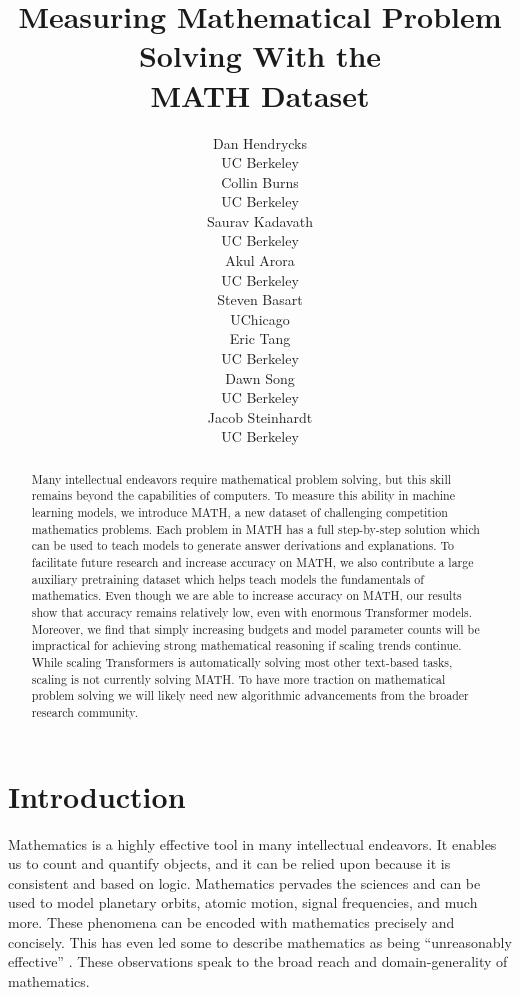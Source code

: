 \documentclass{article}
\title{Measuring Mathematical Problem Solving With the\\ MATH Dataset}
\date{}
\author{Dan Hendrycks\\
UC Berkeley\\
\And
Collin Burns\\
UC Berkeley\\
\And
Saurav Kadavath\\
UC Berkeley\\
\And
Akul Arora\\
UC Berkeley\\
\And
Steven Basart\\
UChicago\\
\And
Eric Tang\\
UC Berkeley\\
\And
Dawn Song\\
UC Berkeley\\
\And
Jacob Steinhardt\\
UC Berkeley\\
}
\begin{document}
\maketitle


















\begin{abstract}





Many intellectual endeavors require mathematical problem solving, but this skill remains beyond the capabilities of computers. To measure this ability in machine learning models, we introduce MATH, a new dataset of  challenging competition mathematics problems. Each problem in MATH has a full step-by-step solution which can be used to teach models to generate answer derivations and explanations. To facilitate future research and increase accuracy on MATH, we also contribute a large auxiliary pretraining dataset which helps teach models the fundamentals of mathematics. Even though we are able to increase accuracy on MATH, our results show that accuracy remains relatively low, even with enormous Transformer models. Moreover, we find that simply increasing budgets and model parameter counts will be impractical for achieving strong mathematical reasoning if scaling trends continue.
While scaling Transformers is automatically solving most other text-based tasks, scaling is not currently solving MATH. To have more traction on mathematical problem solving we will likely need new algorithmic advancements from the broader research community.



\end{abstract}


\section{Introduction}















Mathematics is a highly effective tool in many intellectual endeavors.
It enables us to count and quantify objects, and it can be relied upon because it is consistent and based on logic.
Mathematics pervades the sciences and can be used to model planetary orbits, atomic motion, signal frequencies, and much more. These phenomena can be encoded with mathematics precisely and concisely. This has even led some to describe mathematics as being ``unreasonably effective'' \citep{Wigner1960TheUE}. 
These observations speak to the broad reach and domain-generality of mathematics.
\end{document}
